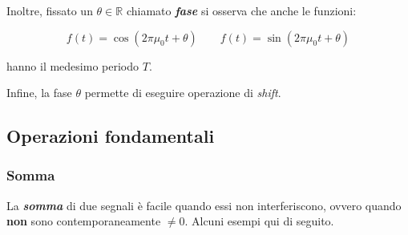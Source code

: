 \documentclass[a4paper]{article}
\begin{document}
	Inoltre, fissato un $\theta\in\mathbb{R}$ chiamato \textbf{\emph{fase}} si osserva che anche le funzioni:
	
	\begin{equation*}
		f(t) = \cos{\left(2 \pi \mu_0 t + \theta\right)} \hspace{2em} f(t) = \sin{\left(2 \pi \mu_0 t + \theta\right)}
	\end{equation*}

	\noindent
	hanno il medesimo periodo $T$.
	
	\noindent
	Infine, la fase $\theta$ permette di eseguire operazione di \emph{shift}.
	
	\newpage
	
	\subsection{Operazioni fondamentali}
	
	\subsubsection{Somma}
	
	La \textbf{\emph{somma}} di due segnali è facile quando essi non interferiscono, ovvero quando \textbf{non} sono contemporaneamente $\ne 0$. Alcuni esempi qui di seguito.
	
\end{document}
